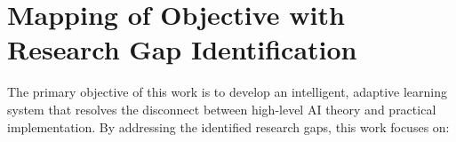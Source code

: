 \section{Mapping of Objective with Research Gap Identification}

The primary objective of this work is to develop an intelligent, adaptive learning system that resolves the disconnect between high-level AI theory and practical implementation. By addressing the identified research gaps, this work focuses on:


